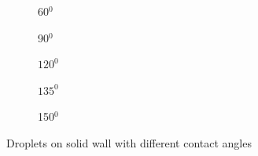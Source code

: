 \documentclass[11pt]{article}
\begin{document}
\begin{figure}[h!]
 	\begin{subfigure}{3cm}
 		\caption{60$ ^{0} $}
 	\end{subfigure}
 	\begin{subfigure}[h!]{3cm}            
 		\caption{90$ ^{0} $}
 		\label{Fig:Datsa1}
 	\end{subfigure}
 	\begin{subfigure}[h!]{3cm}            
 		\caption{$ 120^{0} $}
 		\label{Fig:Datsase3}
 	\end{subfigure}
 	\begin{subfigure}[h!]{3cm}
 		\caption{$ 135^{0} $}
 	\end{subfigure}
 	\begin{subfigure}[h!]{3cm}
	 	\caption{150$ ^{0} $}
	\end{subfigure}
 	\caption{Droplets on solid wall with different contact angles }
 	\label{fig:spinods}
 \end{figure}
\end{document}
